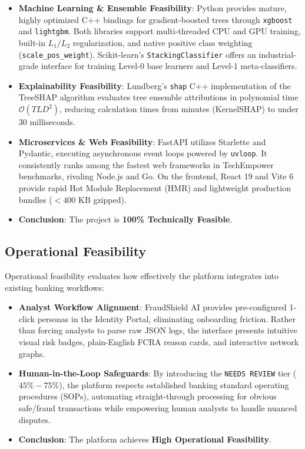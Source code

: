 \documentclass[12pt,a4paper,oneside]{report}
\begin{document}
\begin{itemize}[leftmargin=0.35in]
\item \textbf{Machine Learning \& Ensemble Feasibility}: Python provides mature, highly optimized C++ bindings for gradient-boosted trees through \texttt{xgboost} and \texttt{lightgbm}. Both libraries support multi-threaded CPU and GPU training, built-in $L_1/L_2$ regularization, and native positive class weighting (\texttt{scale\_pos\_weight}). Scikit-learn's \texttt{StackingClassifier} offers an industrial-grade interface for training Level-0 base learners and Level-1 meta-classifiers.
\item \textbf{Explainability Feasibility}: Lundberg's \texttt{shap} C++ implementation of the TreeSHAP algorithm evaluates tree ensemble attributions in polynomial time $\mathcal{O}(T L D^2)$, reducing calculation times from minutes (KernelSHAP) to under 30 milliseconds.
\item \textbf{Microservices \& Web Feasibility}: FastAPI utilizes Starlette and Pydantic, executing asynchronous event loops powered by \texttt{uvloop}. It consistently ranks among the fastest web frameworks in TechEmpower benchmarks, rivaling Node.js and Go. On the frontend, React 19 and Vite 6 provide rapid Hot Module Replacement (HMR) and lightweight production bundles ($< 400\text{ KB}$ gzipped).
\item \textbf{Conclusion}: The project is \textbf{100\% Technically Feasible}.
\end{itemize}

\subsection{Operational Feasibility}

Operational feasibility evaluates how effectively the platform integrates into existing banking workflows:

\begin{itemize}[leftmargin=0.35in]
\item \textbf{Analyst Workflow Alignment}: FraudShield AI provides pre-configured 1-click personas in the Identity Portal, eliminating onboarding friction. Rather than forcing analysts to parse raw JSON logs, the interface presents intuitive visual risk badges, plain-English FCRA reason cards, and interactive network graphs.
\item \textbf{Human-in-the-Loop Safeguards}: By introducing the \texttt{NEEDS REVIEW} tier (\\$45\%-75\%$), the platform respects established banking standard operating procedures (SOPs), automating straight-through processing for obvious safe/fraud transactions while empowering human analysts to handle nuanced disputes.
\item \textbf{Conclusion}: The platform achieves \textbf{High Operational Feasibility}.
\end{itemize}
\end{document}
